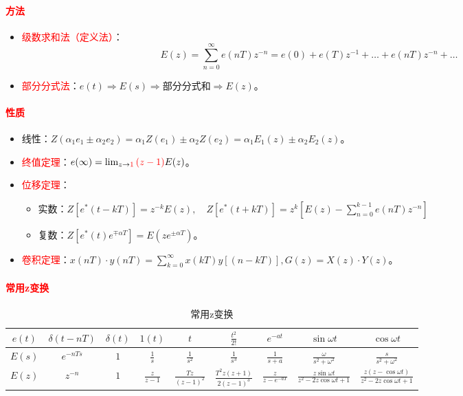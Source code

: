 \documentclass[
12pt, %
a4paper, 
oneside, %
]{scrartcl}
\begin{document}
\paragraph{\textcolor{red}{方法}}
\begin{itemize}
\item \textcolor{red}{级数求和法（定义法）}：
$$ E(z) = \sum_{n = 0}^{\infty} e(nT)z^{-n} = e(0) + e(T)z^{-1} + \dots + e(nT)z^{-n} + \dots $$
\item \textcolor{red}{部分分式法}：$ e(t) \Rightarrow E(s) \Rightarrow $部分分式和$ \Rightarrow E(z) $。
\end{itemize}
\paragraph{\textcolor{red}{性质}}
\begin{itemize}
\item 线性：$ Z(\alpha_1 e_1 \pm \alpha_2 e_2) = \alpha_1 Z(e_1) \pm \alpha_2 Z(e_2) = \alpha_1 E_1(z) \pm \alpha_2 E_2(z) $。
\item \textcolor{red}{终值定理}：$ e(\infty) = \lim_{z \to \textcolor{red}{1}} \textcolor{red}{(z - 1)}E(z) $。
\item \textcolor{red}{位移定理}：
\begin{itemize}
\item 实数：$ Z[e^*(t - kT)] = z^{-k}E(z), \quad Z[e^*(t + kT)] = z^{k}[E(z) - \sum_{n = 0}^{k - 1} e(nT)z^{-n}] $
\item 复数：$ Z[e^*(t)e^{\mp \alpha T}] = E(z e^{\pm \alpha T}) $。
\end{itemize}
\item \textcolor{red}{卷积定理}：$ x(nT) \cdot y(nT) = \sum_{k = 0}^{\infty} x(kT)y[(n - kT)], G(z) = X(z) \cdot Y(z) $。
\end{itemize}
\paragraph{\textcolor{red}{常用z变换}}
\begin{table}[H]
\centering
\begin{tabular}{|c|c|c|c|c|c|c|c|c|}
\hline
$ e(t) $ & $ \delta(t - nT) $ & $ \delta(t) $ & $ 1(t) $ & $ t $ & $ \frac{t^2}{2!} $ & $ e^{-at} $ & $ \sin \omega t $ & $ \cos \omega t $ \\
\hline
$ E(s) $ & $ e^{-nTs} $ & $ 1 $ & $ \frac{1}{s} $ & $ \frac{1}{s^2} $ & $ \frac{1}{s^3} $ & $ \frac{1}{s + a} $ & $ \frac{\omega}{s^2 + \omega^2} $ & $ \frac{s}{s^2 + \omega^2} $ \\
\hline
$ E(z) $ & $ z^{-n} $ & $ 1 $ & $ \frac{z}{z - 1} $ & $ \frac{Tz}{(z - 1)^2} $ & $ \frac{T^2 z(z + 1)}{2(z - 1)^3} $ & $ \frac{z}{z - e^{-aT}} $ & $ \frac{z \sin \omega t}{z^2 - 2z \cos \omega t + 1} $ & $ \frac{z(z - \cos \omega t)}{z^2 - 2z \cos \omega t + 1} $ \\
\hline
\end{tabular}
\caption{常用z变换}
\end{table}
\end{document}
